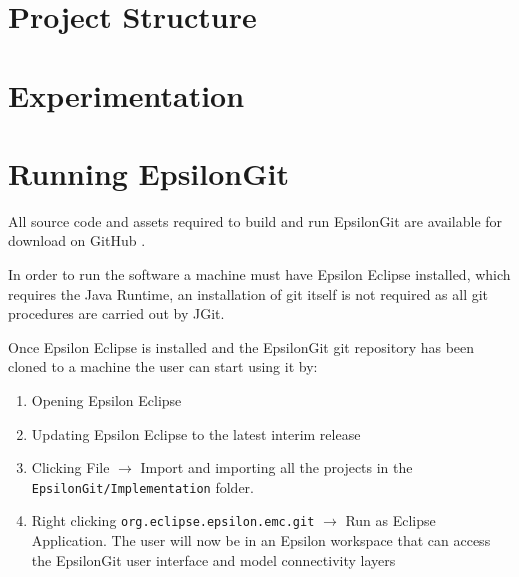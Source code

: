 \documentclass[11pt]{book}
\newcommand{\code}[1]{\texttt{#1}}
\begin{document}
\section{Project Structure}


\section{Experimentation}

	
\section{Running EpsilonGit}
All source code and assets required to build and run EpsilonGit are available for download on GitHub \cite{epsilongitgithub}. 

In order to run the software a machine must have Epsilon Eclipse \cite{epsilonhomepage} installed, which requires the Java Runtime, an installation of git itself is not required as all git procedures are carried out by JGit.

Once Epsilon Eclipse is installed and the EpsilonGit git repository has been cloned to a machine the user can start using it by:

\begin{enumerate}
	\item Opening Epsilon Eclipse
	\item Updating Epsilon Eclipse to the latest interim release
	\item Clicking File $\rightarrow
$ Import and importing all the projects in the \code{EpsilonGit/Implementation} folder.
	\item Right clicking \code{org.eclipse.epsilon.emc.git} $\rightarrow
$ Run as Eclipse Application. The user will now be in an Epsilon workspace that can access the EpsilonGit user interface and model connectivity layers
\end{enumerate}
\end{document}

